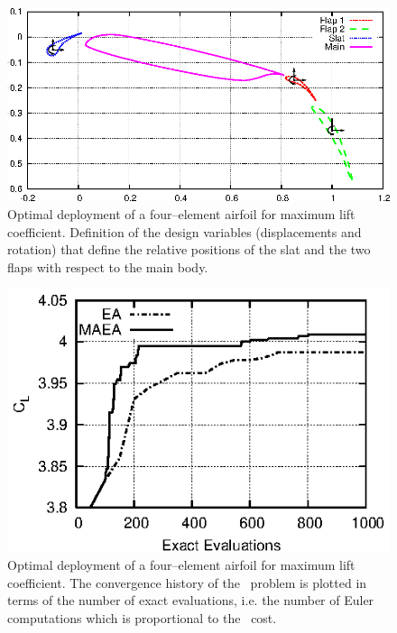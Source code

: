 \documentclass{vki_ls}
\begin{document}
\begin{figure}[ht!]
    \centering
    \includegraphics[scale=1.3]{maeas/4elemDesc.eps}
    \caption{Optimal deployment of a four--element airfoil for maximum lift 
	coefficient. Definition of the design variables (displacements and 
	rotation) that define the relative positions of the slat and the two 
	flaps with respect to the main body.}
    \label{f:elemDesc}
\end{figure}
%
\begin{figure}[ht!]
    \centering
    \includegraphics[scale=1.5]{maeas/4elemEaMaea.eps}
    \caption{Optimal deployment of a four--element airfoil for maximum lift 
	     coefficient. The convergence history of the \SOO\ problem is 
	     plotted in terms of the number of exact evaluations, i.e. 
	     the number of Euler computations which is proportional to the
	     \CPU\ cost.}
    \label{f:elemConv}
\end{figure}
%
\end{document}
